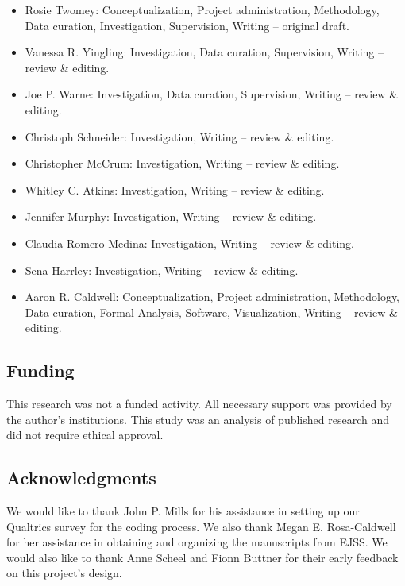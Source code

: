 \documentclass[]{cik}%
\begin{document}
\begin{itemize}
\tightlist
\item
  Rosie Twomey: Conceptualization, Project administration, Methodology,
  Data curation, Investigation, Supervision, Writing -- original draft.
\item
  Vanessa R. Yingling: Investigation, Data curation, Supervision,
  Writing -- review \& editing.
\item
  Joe P. Warne: Investigation, Data curation, Supervision, Writing --
  review \& editing.
\item
  Christoph Schneider: Investigation, Writing -- review \& editing.
\item
  Christopher McCrum: Investigation, Writing -- review \& editing.
\item
  Whitley C. Atkins: Investigation, Writing -- review \& editing.
\item
  Jennifer Murphy: Investigation, Writing -- review \& editing.
\item
  Claudia Romero Medina: Investigation, Writing -- review \& editing.
\item
  Sena Harrley: Investigation, Writing -- review \& editing.
\item
  Aaron R. Caldwell: Conceptualization, Project administration,
  Methodology, Data curation, Formal Analysis, Software, Visualization,
  Writing -- review \& editing.
\end{itemize}

\hypertarget{funding}{%
\subsection{Funding}\label{funding}}

This research was not a funded activity. All necessary support was
provided by the author's institutions. This study was an analysis of
published research and did not require ethical approval.

\hypertarget{acknowledgments}{%
\subsection{Acknowledgments}\label{acknowledgments}}

We would like to thank John P. Mills for his assistance in setting up
our Qualtrics survey for the coding process. We also thank Megan E.
Rosa-Caldwell for her assistance in obtaining and organizing the
manuscripts from EJSS. We would also like to thank Anne Scheel and Fionn
Buttner for their early feedback on this project's design.
\end{document}
